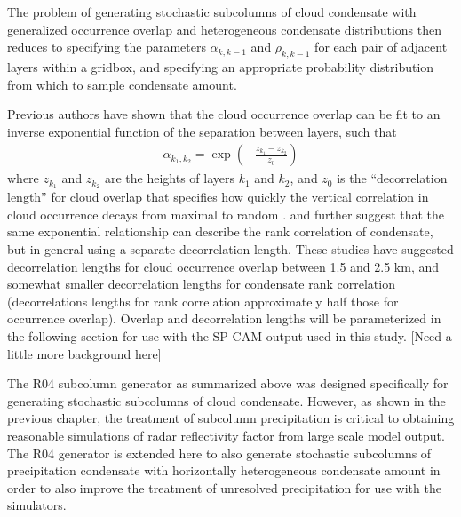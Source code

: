 The problem of generating stochastic subcolumns of cloud condensate with
generalized occurrence overlap and heterogeneous condensate
distributions then reduces to specifying the parameters
\(\alpha_{k, k-1}\) and \(\rho_{k, k-1}\) for each pair of adjacent
layers within a gridbox, and specifying an appropriate probability
distribution from which to sample condensate amount.

Previous authors have shown that the cloud occurrence overlap can be fit
to an inverse exponential function of the separation between layers,
such that
\begin{equation}\begin{gathered} \alpha_{k_1, k_2} = \exp\left(-\frac{z_{k_1} -
z_{k_2}}{z_0}\right) \end{gathered}\label{eq:alpha_exponential_equation}\end{equation}
where \(z_{k_1}\) and \(z_{k_2}\) are the heights of layers \(k_1\) and
\(k_2\), and \(z_0\) is the ``decorrelation length'' for cloud overlap
that specifies how quickly the vertical correlation in cloud occurrence
decays from maximal to random
\citep{hogan_and_illingworth_2000, mace_and_benson-troth_2002, raisanen_et_al_2004, pincus_et_al_2005, barker_2008, tompkins_and_digiuseppe_2015}.
\citet{raisanen_et_al_2004} and \citet{pincus_et_al_2005} further
suggest that the same exponential relationship can describe the rank
correlation of condensate, but in general using a separate decorrelation
length. These studies have suggested decorrelation lengths for cloud
occurrence overlap between 1.5 and 2.5 km, and somewhat smaller
decorrelation lengths for condensate rank correlation (decorrelations
lengths for rank correlation approximately half those for occurrence
overlap). Overlap and decorrelation lengths will be parameterized in the
following section for use with the SP-CAM output used in this study.
{[}Need a little more background here{]}

The R04 subcolumn generator as summarized above was designed
specifically for generating stochastic subcolumns of cloud condensate.
However, as shown in the previous chapter, the treatment of subcolumn
precipitation is critical to obtaining reasonable simulations of radar
reflectivity factor from large scale model output. The R04 generator is
extended here to also generate stochastic subcolumns of precipitation
condensate with horizontally heterogeneous condensate amount in order to
also improve the treatment of unresolved precipitation for use with the
simulators.

